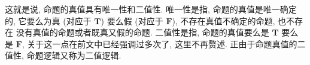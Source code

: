 \documentclass[10pt,UTF8]{book} %
\begin{document}
这就是说, 命题的真值具有唯一性和二值性. 唯一性是指, 命题的真值是唯一确定的, 它要么为真
(对应于 $\mathbf{T}$) 要么假 (对应于 $\mathbf{F}$), 不存在真值不确定的命题, 也不存在
没有真值的命题或者既真又假的命题. 二值性是指, 命题的真值要么是 $\mathbf{T}$ 要么是 $\mathbf{F}$,
关于这一点在前文中已经强调过多次了, 这里不再赘述. 正由于命题真值的二值性,
命题逻辑又称为二值逻辑.

\end{document}
